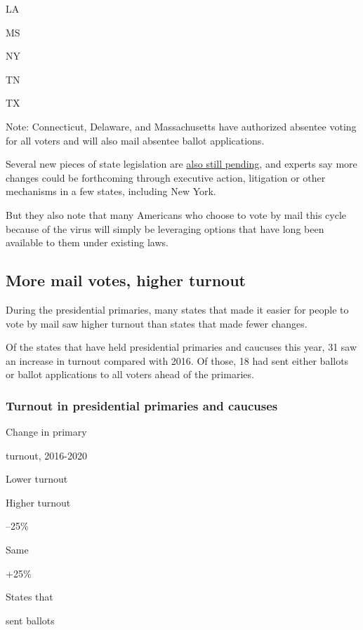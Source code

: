 LA

MS

NY

TN

TX

Note: Connecticut, Delaware, and Massachusetts have authorized absentee
voting for all voters and will also mail absentee ballot applications.

Several new pieces of state legislation are
\href{https://www.ncsl.org/research/elections-and-campaigns/state-action-on-covid-19-and-elections.aspx}{also
still pending}, and experts say more changes could be forthcoming
through executive action, litigation or other mechanisms in a few
states, including New York.

But they also note that many Americans who choose to vote by mail this
cycle because of the virus will simply be leveraging options that have
long been available to them under existing laws.

\hypertarget{more-mail-votes-higher-turnout}{%
\subsection{More mail votes, higher
turnout}\label{more-mail-votes-higher-turnout}}

During the presidential primaries, many states that made it easier for
people to vote by mail saw higher turnout than states that made fewer
changes.

Of the states that have held presidential primaries and caucuses this
year, 31 saw an increase in turnout compared with 2016. Of those, 18 had
sent either ballots or ballot applications to all voters ahead of the
primaries.

\hypertarget{turnout-in-presidential-primaries-and-caucuses}{%
\subsubsection{Turnout in presidential primaries and
caucuses}\label{turnout-in-presidential-primaries-and-caucuses}}

Change in primary

turnout, 2016-2020

Lower turnout

Higher turnout

--25\%

Same

+25\%

States that

sent ballots

